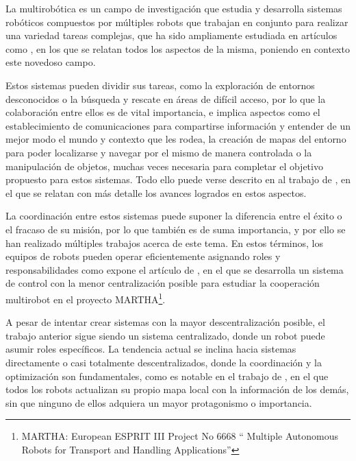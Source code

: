 La multirobótica es un campo de investigación que estudia y desarrolla sistemas
robóticos compuestos por múltiples robots que trabajan en conjunto para realizar
una variedad tareas complejas, que ha sido ampliamente estudiada en artículos
como \cite{Verma2021}, en los que se relatan todos los aspectos de la misma,
poniendo en contexto este novedoso campo.

Estos sistemas pueden dividir sus tareas, como la exploración de entornos
desconocidos o la búsqueda y rescate en áreas de difícil acceso, por lo que la
colaboración entre ellos es de vital importancia, e implica aspectos como el
establecimiento de comunicaciones para compartirse información y entender de un
mejor modo el mundo y contexto que les rodea, la creación de mapas del entorno
para poder localizarse y navegar por el mismo de manera controlada o la
manipulación de objetos, muchas veces necesaria para completar el objetivo
propuesto para estos sistemas.
Todo ello puede verse descrito en al trabajo de \cite{Parker2003}, en el que se
relatan con más detalle los avances logrados en estos aspectos.

La coordinación entre estos sistemas puede suponer la diferencia entre el éxito
o el fracaso de su misión, por lo que también es de suma importancia, y por ello
se han realizado múltiples trabajos acerca de este tema.
En estos términos, los equipos de robots pueden operar eficientemente
asignando roles y responsabilidades como expone el artículo de \cite{Alami1998},
en el que se desarrolla un sistema de control con la menor centralización
posible para estudiar la cooperación multirobot en el proyecto
MARTHA\footnote{MARTHA: European ESPRIT III Project No 6668 \textquotedblleft
Multiple Autonomous Robots for Transport and Handling
Applications\textquotedblright}.

A pesar de intentar crear sistemas con la mayor descentralización posible, el
trabajo anterior sigue siendo un sistema centralizado, donde un robot puede
asumir roles específicos.
La tendencia actual se inclina hacia sistemas directamente o casi totalmente
descentralizados, donde la coordinación y la optimización son fundamentales,
como es notable en el trabajo de \cite{Sheng2006}, en el que todos los robots
actualizan su propio mapa local con la información de los demás, sin que ninguno
de ellos adquiera un mayor protagonismo o importancia.

